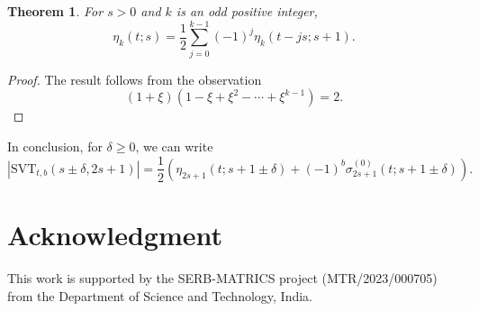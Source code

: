 \documentclass[12pt]{article}
\newtheorem{thm}{Theorem}[subsection]%
\begin{document}
\begin{thm}For $s>0$ and $k$ is an odd positive integer,
$$
\eta_{k}(t;s)=\frac{1}{2}\sum_{j=0}^{k-1}(-1)^{j}\eta_{k}(t-js;s+1).
$$    
\end{thm}
\begin{proof} The result follows from the observation
 $$
 (1+\xi)(1-\xi+\xi^{2}-\cdots+\xi^{k-1})=2.
 $$   
\end{proof}
In conclusion, for $\delta\geq 0$, we can write 
$$
|\text{SVT}_{t,b}(s\pm\delta,2s+1)| = \frac{1}{2}\left(\eta_{2s+1}(t;s+1\pm\delta)+(-1)^{b}\sigma_{2s+1}^{(0)}(t;s+1\pm\delta)\right).
$$









\section*{Acknowledgment}
This work is supported by the SERB-MATRICS project (MTR/2023/000705) from the Department of Science and Technology, India.



  



\end{document}
